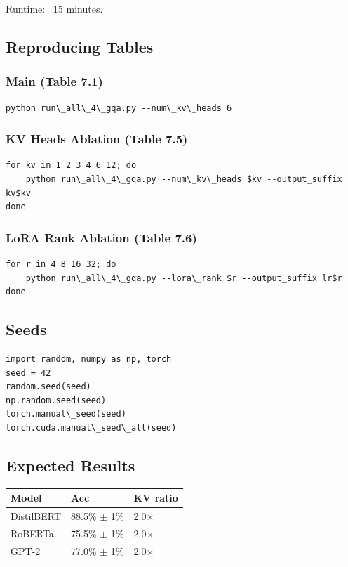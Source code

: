 Runtime: ~15 minutes.

\subsection{Reproducing Tables}

\subsubsection{Main (Table 7.1)}

\begin{lstlisting}
python run\_all\_4\_gqa.py --num\_kv\_heads 6
\end{lstlisting}

\subsubsection{KV Heads Ablation (Table 7.5)}

\begin{lstlisting}
for kv in 1 2 3 4 6 12; do
    python run\_all\_4\_gqa.py --num\_kv\_heads $kv --output_suffix kv$kv
done
\end{lstlisting}

\subsubsection{LoRA Rank Ablation (Table 7.6)}

\begin{lstlisting}
for r in 4 8 16 32; do
    python run\_all\_4\_gqa.py --lora\_rank $r --output_suffix lr$r
done
\end{lstlisting}

\subsection{Seeds}

\begin{lstlisting}
import random, numpy as np, torch
seed = 42
random.seed(seed)
np.random.seed(seed)
torch.manual\_seed(seed)
torch.cuda.manual\_seed\_all(seed)
\end{lstlisting}

\subsection{Expected Results}

\begin{table}[H]
\centering
\small
\begin{tabular}{lll}
\toprule
\textbf{Model} & \textbf{Acc} & \textbf{KV ratio} \\
\midrule
DistilBERT & 88.5\% $\pm$ 1\% & 2.0$\times$ \\
RoBERTa & 75.5\% $\pm$ 1\% & 2.0$\times$ \\
GPT-2 & 77.0\% $\pm$ 1\% & 2.0$\times$ \\
\bottomrule
\end{tabular}
\end{table}

